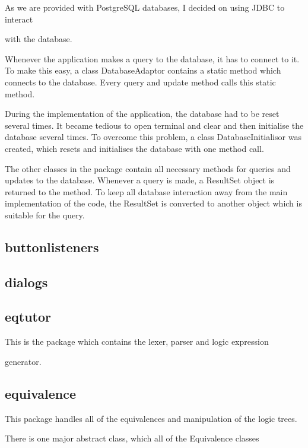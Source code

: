 \documentclass{report}
\begin{document}
As we are provided with PostgreSQL databases, I decided on using JDBC to interact

with the database.

Whenever the application makes a query to the database, it has to connect
to it. To make this easy, a class DatabaseAdaptor contains a static method
which connects to the database. Every query and update method calls this
static method.

During the implementation of the application, the database had to be reset
several times. It became tedious to open terminal and clear and then
initialise the database several times. To overcome this problem, a class
DatabaseInitialisor was created, which resets and initialises the database
with one method call.

The other classes in the package contain all necessary methods for queries and
updates to the database. Whenever a query is made, a ResultSet object is returned
to the method. To keep all database interaction away from the main implementation
of the code, the ResultSet is converted to another object which is suitable
for the query.



\subsection{buttonlisteners}



\subsection{dialogs}



\subsection{eqtutor}

This is the package which contains the lexer, parser and logic expression

generator.



\subsection{equivalence}

This package handles all of the equivalences and manipulation of the logic trees.

There is one major abstract class, which all of the Equivalence classes
\end{document}
